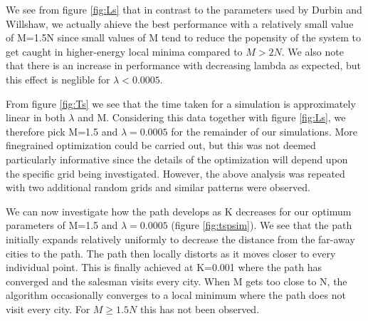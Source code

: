 \documentclass{article}
\begin{document}
We see from figure \ref{fig:Ls} that in contrast to the parameters used by Durbin and Willshaw, we actually ahieve the best performance with a relatively small value of M=1.5N since small values of M tend to reduce the popensity of the system to get caught in higher-energy local minima compared to $M > 2N$. We also note that there is an increase in performance with decreasing lambda as expected, but this effect is neglible for $\lambda < 0.0005$.

From figure \ref{fig:Ts} we see that the time taken for a simulation is approximately linear in both $\lambda$ and M. Considering this data together with figure \ref{fig:Ls}, we therefore pick M=1.5 and $\lambda = 0.0005$ for the remainder of our simulations. More finegrained optimization could be carried out, but this was not deemed particularly informative since the details of the optimization will depend upon the specific grid being investigated. However, the above analysis was repeated with two additional random grids and similar patterns were observed.

We can now investigate how the path develops as K decreases for our optimum parameters of M=1.5 and $\lambda = 0.0005$ (figure \ref{fig:tspsim}). We see that the path initially expands relatively uniformly to decrease the distance from the far-away cities to the path. The path then locally distorts as it moves closer to every individual point. This is finally achieved at K=0.001 where the path has converged and the salesman visits every city. When M gets too close to N, the algorithm occasionally converges to a local minimum where the path does not visit every city. For $M \geq 1.5N$ this has not been observed.
\end{document}
